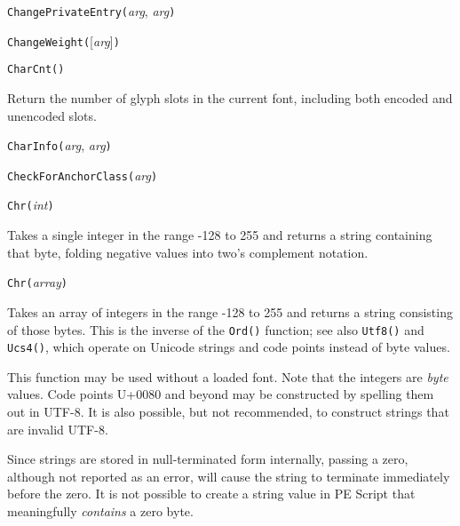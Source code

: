 

\texttt{ChangePrivateEntry(}\textit{arg}, \textit{arg}\texttt{)}



\texttt{ChangeWeight(}[\textit{arg}]\texttt{)}



\texttt{CharCnt()}

Return the number of glyph slots in the current font, including both encoded
and unencoded slots.



\texttt{CharInfo(}\textit{arg}, \textit{arg}\texttt{)}



\texttt{CheckForAnchorClass(}\textit{arg}\texttt{)}



\texttt{Chr(}\textit{int}\texttt{)}

Takes a single integer in the range -128 to 255 and returns a string
containing that byte, folding negative values into two's complement
notation.

\noindent\texttt{Chr(}\textit{array}\texttt{)}

Takes an array of integers in the range -128 to 255 and returns a string
consisting of those bytes.  This is the inverse of the \texttt{Ord()}
function; see also \texttt{Utf8()} and \texttt{Ucs4()}, which operate on
Unicode strings and code points instead of byte values.

This function may be used without a loaded font.  Note that the integers are
\emph{byte} values.  Code points U+0080 and beyond may be constructed by
spelling them out in UTF-8.  It is also possible, but not recommended, to
construct strings that are invalid UTF-8.

Since strings are stored in null-terminated form internally, passing a zero,
although not reported as an error, will cause the string to terminate
immediately before the zero.  It is not possible to create a string value in
PE Script that meaningfully \emph{contains} a zero byte.

